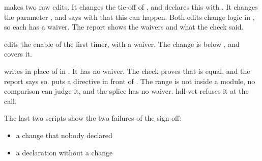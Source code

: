 













 makes two raw edits. It changes the tie-off of , and
declares this with . It changes the parameter , and says
with  that this can happen. Both edits change logic in , so
each has a waiver. The report shows the waivers and what the check said.

 edits the enable of the first timer, with a waiver. The change is below
, and  covers it.

 writes  in place of  in
. It has no waiver. The check proves that  is equal, and the report
says so.  puts a directive in front of . The
range is not inside a module, no comparison can judge it, and the splice has no waiver.
hdl-vet refuses it at the call.

The last two scripts show the two failures of the sign-off:

\begin{itemize}
\item a change that nobody declared
\item a declaration without a change
\end{itemize}
